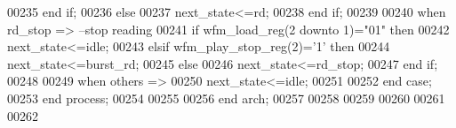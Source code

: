 \begin{DoxyCode}
00235                 \textcolor{keywordflow}{end} \textcolor{keywordflow}{if};
00236             \textcolor{keywordflow}{else} 
00237                 \textcolor{vhdlchar}{next_state}\textcolor{vhdlchar}{<=}\textcolor{vhdlchar}{rd};
00238             \textcolor{keywordflow}{end} \textcolor{keywordflow}{if};
00239         
00240         \textcolor{keywordflow}{when} \textcolor{vhdlchar}{rd\_stop} \textcolor{vhdlchar}{=}\textcolor{vhdlchar}{>}\textcolor{keyword}{ --stop reading }
00241             \textcolor{keywordflow}{if} \textcolor{vhdlchar}{wfm_load_reg}\textcolor{vhdlchar}{(}\textcolor{vhdllogic}{}\textcolor{vhdllogic}{2} \textcolor{keywordflow}{downto} \textcolor{vhdllogic}{}\textcolor{vhdllogic}{1}\textcolor{vhdlchar}{)}\textcolor{vhdlchar}{=}\textcolor{vhdllogic}{"01"} \textcolor{keywordflow}{then} 
00242                 \textcolor{vhdlchar}{next_state}\textcolor{vhdlchar}{<=}\textcolor{vhdlchar}{idle};
00243             \textcolor{keywordflow}{elsif} \textcolor{vhdlchar}{wfm_play_stop_reg}\textcolor{vhdlchar}{(}\textcolor{vhdllogic}{}\textcolor{vhdllogic}{2}\textcolor{vhdlchar}{)}\textcolor{vhdlchar}{=}\textcolor{vhdlchar}{'}\textcolor{vhdllogic}{}\textcolor{vhdllogic}{1}\textcolor{vhdlchar}{'} \textcolor{keywordflow}{then} 
00244                 \textcolor{vhdlchar}{next_state}\textcolor{vhdlchar}{<=}\textcolor{vhdlchar}{burst\_rd};
00245             \textcolor{keywordflow}{else} 
00246                 \textcolor{vhdlchar}{next_state}\textcolor{vhdlchar}{<=}\textcolor{vhdlchar}{rd\_stop};
00247             \textcolor{keywordflow}{end} \textcolor{keywordflow}{if};
00248             
00249         \textcolor{keywordflow}{when} \textcolor{keywordflow}{others} \textcolor{vhdlchar}{=}\textcolor{vhdlchar}{>} 
00250             \textcolor{vhdlchar}{next_state}\textcolor{vhdlchar}{<=}\textcolor{vhdlchar}{idle};
00251 
00252     \textcolor{keywordflow}{end} \textcolor{keywordflow}{case};
00253 \textcolor{keywordflow}{end} \textcolor{keywordflow}{process};
00254 
00255   
00256 \textcolor{keywordflow}{end} \textcolor{vhdlchar}{arch};   
00257 
00258 
00259 
00260 
00261 
00262 
\end{DoxyCode}

